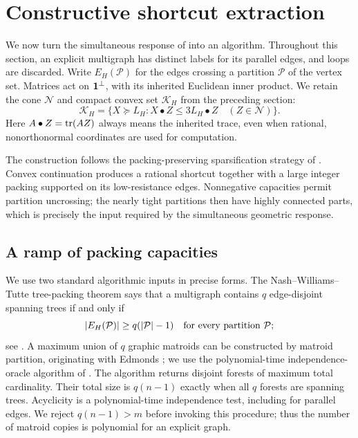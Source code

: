 \section{Constructive shortcut extraction}
\label{sec:ta-algorithm}

We now turn the simultaneous response of  into an
algorithm. Throughout this section, an explicit multigraph has distinct
labels for its parallel edges, and loops are discarded. Write
$E_H(\mathcal P)$ for the edges crossing a partition $\mathcal P$ of the
vertex set. Matrices act on $\mathbf 1^\perp$, with its inherited Euclidean
inner product. We retain the cone $\mathcal N$ and compact convex set
$\mathcal K_H$ from the preceding section:
\begin{equation}
 \mathcal K_H=\{X\succeq L_H:
       X\mathbin\bullet Z\le3L_H\mathbin\bullet Z\quad(Z\in\mathcal N)\}.
 \label{eq:ta-K}
\end{equation}
Here $A\mathbin\bullet Z=\operatorname{tr}(AZ)$ always means the inherited trace, even
when rational, nonorthonormal coordinates are used for computation.



The construction follows the packing-preserving sparsification strategy
of \cite{ThinTreesCompanion}. Convex continuation produces a rational
shortcut together with a large integer packing supported on its
low-resistance edges. Nonnegative capacities permit partition uncrossing;
the nearly tight partitions then have highly connected parts, which is
precisely the input required by the simultaneous geometric response.

\subsection{A ramp of packing capacities}

We use two standard algorithmic inputs in precise forms. The
Nash--Williams--Tutte tree-packing theorem
\cite{NashWilliams1961,Tutte1961} says that a multigraph contains $q$ edge-disjoint
spanning trees if and only if
\begin{equation}
 |E_H(\mathcal P)|\ge q(|\mathcal P|-1)
                \quad\hbox{for every partition }\mathcal P;
 \label{eq:ta-integer-packing}
\end{equation}
see \cite[Theorem~1]{Kaiser2012}. A maximum union of $q$ graphic matroids
can be constructed by matroid partition, originating with Edmonds
\cite{Edmonds1968}; we use the polynomial-time independence-oracle
algorithm of \cite[Theorem~14]{Terao2023}. The algorithm
returns disjoint forests of maximum total cardinality. Their total size
is $q(n-1)$ exactly when all $q$ forests are spanning trees. Acyclicity
is a polynomial-time independence test, including for parallel edges.
We reject $q(n-1)>m$ before invoking this procedure; thus the number of
matroid copies is polynomial for an explicit graph.

